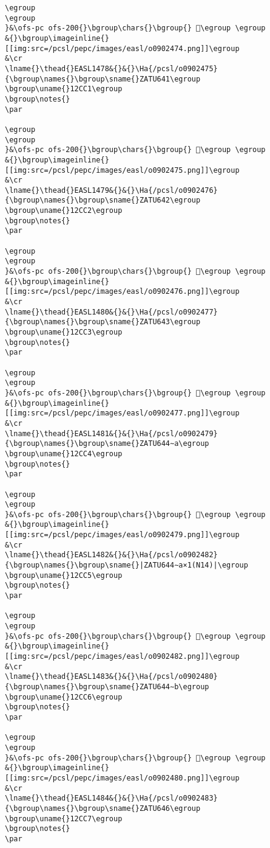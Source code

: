 \begin{verbatim}
\egroup
\egroup
}&\ofs-pc ofs-200{}\bgroup\chars{}\bgroup{} 𒳀\egroup \egroup
&{}\bgroup\imageinline{}[[img:src=/pcsl/pepc/images/easl/o0902474.png]]\egroup
&\cr
\lname{}\thead{}EASL1478&{}&{}\Ha{/pcsl/o0902475}{\bgroup\names{}\bgroup\sname{}ZATU641\egroup
\bgroup\uname{}12CC1\egroup
\bgroup\notes{}
\par 

\egroup
\egroup
}&\ofs-pc ofs-200{}\bgroup\chars{}\bgroup{} 𒳁\egroup \egroup
&{}\bgroup\imageinline{}[[img:src=/pcsl/pepc/images/easl/o0902475.png]]\egroup
&\cr
\lname{}\thead{}EASL1479&{}&{}\Ha{/pcsl/o0902476}{\bgroup\names{}\bgroup\sname{}ZATU642\egroup
\bgroup\uname{}12CC2\egroup
\bgroup\notes{}
\par 

\egroup
\egroup
}&\ofs-pc ofs-200{}\bgroup\chars{}\bgroup{} 𒳂\egroup \egroup
&{}\bgroup\imageinline{}[[img:src=/pcsl/pepc/images/easl/o0902476.png]]\egroup
&\cr
\lname{}\thead{}EASL1480&{}&{}\Ha{/pcsl/o0902477}{\bgroup\names{}\bgroup\sname{}ZATU643\egroup
\bgroup\uname{}12CC3\egroup
\bgroup\notes{}
\par 

\egroup
\egroup
}&\ofs-pc ofs-200{}\bgroup\chars{}\bgroup{} 𒳃\egroup \egroup
&{}\bgroup\imageinline{}[[img:src=/pcsl/pepc/images/easl/o0902477.png]]\egroup
&\cr
\lname{}\thead{}EASL1481&{}&{}\Ha{/pcsl/o0902479}{\bgroup\names{}\bgroup\sname{}ZATU644∼a\egroup
\bgroup\uname{}12CC4\egroup
\bgroup\notes{}
\par 

\egroup
\egroup
}&\ofs-pc ofs-200{}\bgroup\chars{}\bgroup{} 𒳄\egroup \egroup
&{}\bgroup\imageinline{}[[img:src=/pcsl/pepc/images/easl/o0902479.png]]\egroup
&\cr
\lname{}\thead{}EASL1482&{}&{}\Ha{/pcsl/o0902482}{\bgroup\names{}\bgroup\sname{}|ZATU644∼a×1(N14)|\egroup
\bgroup\uname{}12CC5\egroup
\bgroup\notes{}
\par 

\egroup
\egroup
}&\ofs-pc ofs-200{}\bgroup\chars{}\bgroup{} 𒳅\egroup \egroup
&{}\bgroup\imageinline{}[[img:src=/pcsl/pepc/images/easl/o0902482.png]]\egroup
&\cr
\lname{}\thead{}EASL1483&{}&{}\Ha{/pcsl/o0902480}{\bgroup\names{}\bgroup\sname{}ZATU644∼b\egroup
\bgroup\uname{}12CC6\egroup
\bgroup\notes{}
\par 

\egroup
\egroup
}&\ofs-pc ofs-200{}\bgroup\chars{}\bgroup{} 𒳆\egroup \egroup
&{}\bgroup\imageinline{}[[img:src=/pcsl/pepc/images/easl/o0902480.png]]\egroup
&\cr
\lname{}\thead{}EASL1484&{}&{}\Ha{/pcsl/o0902483}{\bgroup\names{}\bgroup\sname{}ZATU646\egroup
\bgroup\uname{}12CC7\egroup
\bgroup\notes{}
\par 


\end{verbatim}

